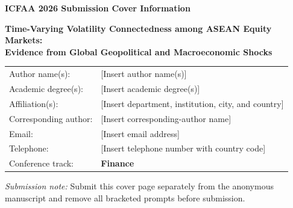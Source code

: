 \documentclass[12pt,a4paper]{article}
\newcommand{\AuthorNames}{[Insert author name(s)]}
\newcommand{\AuthorDegrees}{[Insert academic degree(s)]}
\newcommand{\AuthorAffiliations}{[Insert department, institution, city, and country]}
\newcommand{\CorrespondingAuthor}{[Insert corresponding-author name]}
\newcommand{\CorrespondingEmail}{[Insert email address]}
\newcommand{\CorrespondingPhone}{[Insert telephone number with country code]}
\newcommand{\ConferenceTrack}{Finance}
\newcommand{\PaperTitle}{Time-Varying Volatility Connectedness among ASEAN Equity Markets:\\
Evidence from Global Geopolitical and Macroeconomic Shocks}
\begin{document}
\begin{titlepage}
\begin{center}
{\large\bfseries ICFAA 2026 Submission Cover Information\par}
\vspace{1.5cm}
{\Large\bfseries \PaperTitle\par}
\vspace{1.5cm}
\begin{tabular}{@{}p{}p{}@{}}
Author name(s): & \AuthorNames \\
Academic degree(s): & \AuthorDegrees \\
Affiliation(s): & \AuthorAffiliations \\
Corresponding author: & \CorrespondingAuthor \\
Email: & \CorrespondingEmail \\
Telephone: & \CorrespondingPhone \\
Conference track: & \textbf{\ConferenceTrack} \\
\end{tabular}
\end{center}
\vfill
\textit{Submission note:} Submit this cover page separately from the anonymous manuscript and remove all bracketed prompts before submission.
\end{titlepage}
\end{document}
